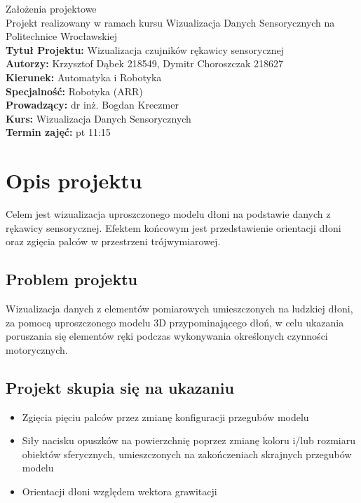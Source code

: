 \documentclass[12pt,a4paper]{article}
\begin{document}
\LARGE\centering Założenia projektowe\\
\large\centering Projekt realizowany w ramach kursu Wizualizacja Danych Sensorycznych na Politechnice Wrocławskiej\\
\vspace{5 mm}
\normalsize\flushleft\textbf{Tytuł Projektu:} Wizualizacja czujników rękawicy sensorycznej\\
\textbf{Autorzy:} Krzysztof Dąbek 218549, Dymitr Choroszczak 218627\\
\textbf{Kierunek:} Automatyka i Robotyka\\
\textbf{Specjalność:} Robotyka (ARR)\\
\textbf{Prowadzący:} dr inż. Bogdan Kreczmer\\
\textbf{Kurs:} Wizualizacja Danych Sensorycznych\\
\textbf{Termin zajęć:} pt 11:15\\
\vspace{5 mm}

\section{Opis projektu} \normalsize
Celem jest wizualizacja uproszczonego modelu dłoni na podstawie danych z rękawicy sensorycznej. 
Efektem końcowym jest przedstawienie orientacji dłoni oraz zgięcia palców w przestrzeni trójwymiarowej. \\
\vspace{1cm}

\subsection{Problem projektu}
Wizualizacja danych z elementów pomiarowych umieszczonych na ludzkiej dłoni, za pomocą uproszczonego modelu 3D przypominającego dłoń, w celu ukazania poruszania się elementów ręki podczas wykonywania określonych czynności motorycznych.

\subsection{Projekt skupia się na ukazaniu}
\begin{itemize}
\item Zgięcia pięciu palców przez zmianę konfiguracji przegubów modelu
\item Siły nacisku opuszków na powierzchnię poprzez zmianę koloru i/lub rozmiaru obiektów sferycznych, umieszczonych na zakończeniach skrajnych przegubów modelu
\item Orientacji dłoni względem wektora grawitacji
\end{itemize}
\end{document}
